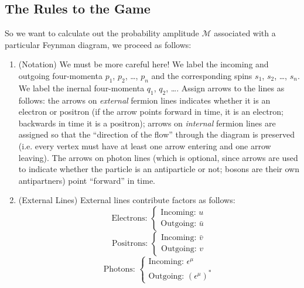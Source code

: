 \subsection{The Rules to the Game}

So we want to calculate out the probability amplitude $\mathcal{M}$ associated
with a particular Feynman diagram, we proceed as follows:
\begin{enumerate}
\item{(Notation)} We must be more careful here! We label the incoming and 
outgoing four-momenta $p_1$, $p_2$, \ldots, $p_n$ and the corresponding spins
$s_1$, $s_2$, \ldots, $s_n$. We label the inernal four-momenta $q_1$, $q_2$, \ldots.
Assign arrows to the lines as follows: the arrows on \emph{external} fermion lines 
indicates whether it is an electron or positron (if the arrow points forward in 
time, it is an electron; backwards in time it is a positron); arrows on
\emph{internal} fermion lines are assigned so that the ``direction of the flow''
through the diagram is preserved (i.e. every vertex must have at least one arrow
entering and one arrow leaving). The arrows on photon lines (which is optional,
since arrows are used to indicate whether the particle is an antiparticle or not;
bosons are their own antipartners) point ``forward'' in time.

\item{(External Lines)} External lines contribute factors as follows:
\begin{equation*}
\mbox{Electrons: } \begin{cases} \mbox{Incoming: } u\\
\mbox{Outgoing: }\bar{u} \end{cases}
\end{equation*}
\begin{equation*}
\mbox{Positrons: } \begin{cases} \mbox{Incoming: } \bar{v}\\
\mbox{Outgoing: }v\end{cases}
\end{equation*}
\begin{equation*}
\mbox{Photons: } \begin{cases} \mbox{Incoming: }\epsilon^\mu \\
\mbox{Outgoing: }(\epsilon^\mu)^* \end{cases}
\end{equation*}


\end{enumerate}
